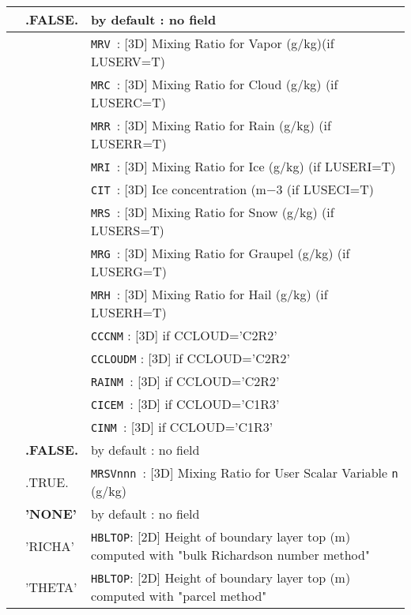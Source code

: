 \begin{center}
\begin{makeimage}
\begin{tabular}{|>{\centering}p{3cm}|>{\centering}p{2.5cm}|p{11cm}|}
\hline
\multirow{10}{*}{LVAR\_MRW}\index{LVAR\_MRW!\innam{NAM\_DIAG}}&\textbf{.FALSE.} & by default : no field\\\cline{2-3}
&\multirow{9}{*}{.TRUE.} &{\tt MRV }: [3D] Mixing Ratio for Vapor (g/kg)(if LUSERV=T)\\\cline{3-3}
& &{\tt MRC }: [3D] Mixing Ratio for Cloud (g/kg) (if LUSERC=T)\\\cline{3-3}
& &{\tt MRR }: [3D] Mixing Ratio for Rain (g/kg) (if LUSERR=T)\\\cline{3-3}
& &{\tt MRI }: [3D] Mixing Ratio for Ice (g/kg) (if LUSERI=T)\\\cline{3-3}
& &{\tt CIT }: [3D] Ice concentration (m${-3}$ (if LUSECI=T)\\\cline{3-3}
& &{\tt MRS }: [3D] Mixing Ratio for Snow (g/kg) (if LUSERS=T)\\\cline{3-3}
& &{\tt MRG }: [3D] Mixing Ratio for Graupel (g/kg) (if LUSERG=T)\\\cline{3-3}
& &{\tt MRH }: [3D] Mixing Ratio for Hail (g/kg) (if LUSERH=T)\\\cline{3-3}
& &{\tt CCCNM} : [3D] if CCLOUD='C2R2' \\\cline{3-3}
& &{\tt CCLOUDM} : [3D] if CCLOUD='C2R2' \\\cline{3-3}
& &{\tt RAINM }: [3D] if CCLOUD='C2R2' \\\cline{3-3}
& &{\tt CICEM }: [3D] if CCLOUD='C1R3' \\\cline{3-3}
& &{\tt CINM }: [3D] if CCLOUD='C1R3' \\\hline
\hline
\multirow{2}{*}{LVAR\_MRSV}\index{LVAR\_MRSV!\innam{NAM\_DIAG}}&\textbf{.FALSE.} & by default : no field\\\cline{2-3}
&.TRUE. &{\tt MRSVnnn }: [3D] Mixing Ratio for User Scalar Variable {\tt n }(g/kg) \\ \hline
\multirow{3}{*}{CBLTOP}\index{CBLTOP!\innam{NAM\_DIAG}}&\textbf{'NONE'} & by default : no field \\\cline{2-3}
&'RICHA' &{\tt HBLTOP}: [2D] Height of boundary layer top (m) computed with "bulk Richardson number method"\\\cline{2-3}
&'THETA' &{\tt HBLTOP}: [2D] Height of boundary layer top (m) computed with "parcel method"\\\hline
\end{tabular}
\end{makeimage} 
\end{center}

